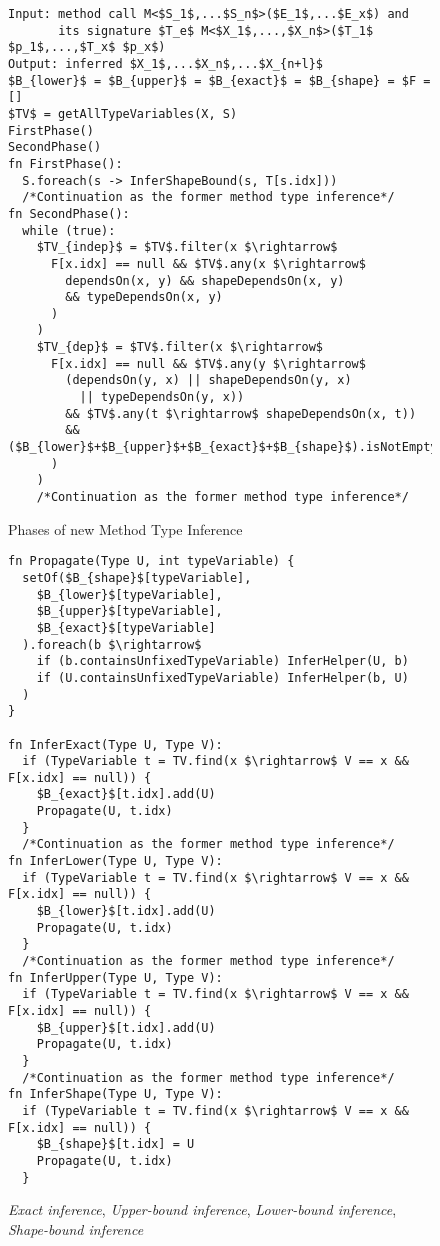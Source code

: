 \begin{figure}[h!]
\begin{lstlisting}[style=myAlgo, mathescape=true]
Input: method call M<$S_1$,...$S_n$>($E_1$,...$E_x$) and 
       its signature $T_e$ M<$X_1$,...,$X_n$>($T_1$ $p_1$,...,$T_x$ $p_x$)
Output: inferred $X_1$,...$X_n$,...$X_{n+l}$
$B_{lower}$ = $B_{upper}$ = $B_{exact}$ = $B_{shape} = $F = []
$TV$ = getAllTypeVariables(X, S)
FirstPhase()
SecondPhase()
fn FirstPhase():
  S.foreach(s -> InferShapeBound(s, T[s.idx]))
  /*Continuation as the former method type inference*/
fn SecondPhase():
  while (true):
    $TV_{indep}$ = $TV$.filter(x $\rightarrow$ 
      F[x.idx] == null && $TV$.any(x $\rightarrow$ 
        dependsOn(x, y) && shapeDependsOn(x, y) 
        && typeDependsOn(x, y)
      )
    )
    $TV_{dep}$ = $TV$.filter(x $\rightarrow$
      F[x.idx] == null && $TV$.any(y $\rightarrow$ 
        (dependsOn(y, x) || shapeDependsOn(y, x) 
          || typeDependsOn(y, x)) 
        && $TV$.any(t $\rightarrow$ shapeDependsOn(x, t))
        && ($B_{lower}$+$B_{upper}$+$B_{exact}$+$B_{shape}$).isNotEmpty
      )
    )
    /*Continuation as the former method type inference*/
\end{lstlisting}
\caption{Phases of new Method Type Inference}
\label{img54:mainTypeInference1}
\end{figure}
\begin{figure}[h!]
\begin{lstlisting}[style=myAlgo, mathescape=true]
fn Propagate(Type U, int typeVariable) {
  setOf($B_{shape}$[typeVariable],
    $B_{lower}$[typeVariable],
    $B_{upper}$[typeVariable],
    $B_{exact}$[typeVariable]
  ).foreach(b $\rightarrow$
    if (b.containsUnfixedTypeVariable) InferHelper(U, b)
    if (U.containsUnfixedTypeVariable) InferHelper(b, U)
  )
}

fn InferExact(Type U, Type V):
  if (TypeVariable t = TV.find(x $\rightarrow$ V == x && F[x.idx] == null)) {
    $B_{exact}$[t.idx].add(U)
    Propagate(U, t.idx)
  }
  /*Continuation as the former method type inference*/
fn InferLower(Type U, Type V):
  if (TypeVariable t = TV.find(x $\rightarrow$ V == x && F[x.idx] == null)) {
    $B_{lower}$[t.idx].add(U)
    Propagate(U, t.idx)
  }
  /*Continuation as the former method type inference*/
fn InferUpper(Type U, Type V):
  if (TypeVariable t = TV.find(x $\rightarrow$ V == x && F[x.idx] == null)) {
    $B_{upper}$[t.idx].add(U)
    Propagate(U, t.idx)
  }
  /*Continuation as the former method type inference*/
fn InferShape(Type U, Type V):
  if (TypeVariable t = TV.find(x $\rightarrow$ V == x && F[x.idx] == null)) {
    $B_{shape}$[t.idx] = U
    Propagate(U, t.idx)
  }
\end{lstlisting}
\caption{\textit{Exact inference}, \textit{Upper-bound inference}, \textit{Lower-bound inference}, \textit{Shape-bound inference}}
\label{img55:mainTypeInference2}
\end{figure}

